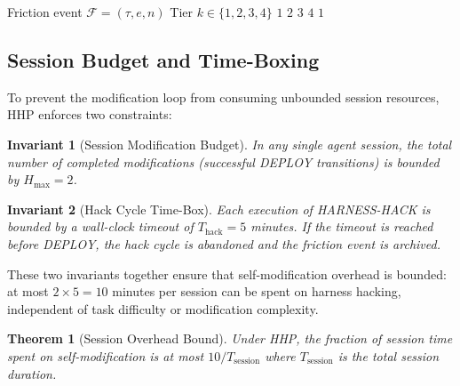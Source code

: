\documentclass[11pt]{article}
\newtheorem{theorem}{Theorem}
\newtheorem{invariant}{Invariant}
\begin{document}
\begin{algorithm}[H]
\caption{ClassifyScope: Map Friction to Modification Tier}
\label{alg:classify}
\begin{algorithmic}[1]
\Require Friction event $\mathcal{F} = (\tau, e, n)$
\Ensure Tier $k \in \{1, 2, 3, 4\}$
    \State \Return $1$ 
    \State \Return $2$ 
    \State \Return $3$ 
    \State \Return $4$ 
\Else
    \State \Return $1$ 
\EndIf
\end{algorithmic}
\end{algorithm}

\subsection{Session Budget and Time-Boxing}
\label{sec:budget}

To prevent the modification loop from consuming unbounded session resources,
HHP enforces two constraints:

\begin{invariant}[Session Modification Budget]
In any single agent session, the total number of completed modifications
(successful DEPLOY transitions) is bounded by $H_{\max} = 2$.
\end{invariant}

\begin{invariant}[Hack Cycle Time-Box]
Each execution of HARNESS-HACK is bounded by a wall-clock timeout of
$T_{\text{hack}} = 5$ minutes. If the timeout is reached before DEPLOY,
the hack cycle is abandoned and the friction event is archived.
\end{invariant}

These two invariants together ensure that self-modification overhead is bounded:
at most $2 \times 5 = 10$ minutes per session can be spent on harness hacking,
independent of task difficulty or modification complexity.

\begin{theorem}[Session Overhead Bound]
\label{thm:overhead}
Under HHP, the fraction of session time spent on self-modification is at most
$10 / T_{\text{session}}$ where $T_{\text{session}}$ is the total session
duration.
\end{theorem}
\end{document}
